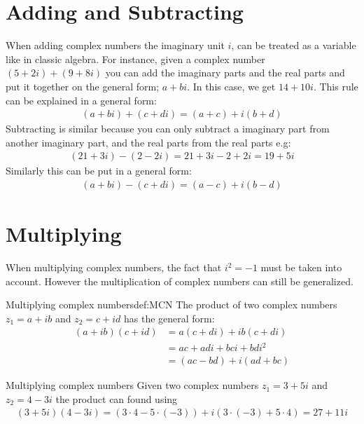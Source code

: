 \section{Adding and Subtracting}
When adding complex numbers the imaginary unit $i$, can be treated as a variable like in classic algebra. For instance, given a complex number $(5+2i)+(9+8i)$ you can add the imaginary parts and the real parts and put it together on the general form; $a+bi$. In this case, we get $14+10i$. This rule can be explained in a general form: 
\begin{align*}
(a + bi) + (c + di) = (a + c) + i(b + d)
\end{align*}
Subtracting is similar because you can only subtract a imaginary part from another imaginary part, and the real parts from the real parts e.g:
\begin{align*}
(21 + 3i) - (2 - 2i) = 21 + 3i - 2 + 2i = 19 + 5i
\end{align*}
Similarly this can be put in a general form:
\begin{align*}
(a + bi) - (c + di) = (a - c) + i(b - d)
\end{align*}

\section{Multiplying}
When multiplying complex numbers, the fact that $i^2 =-1$ must be taken into account. However the multiplication of complex numbers can still be generalized. 
\begin{definition}{Multiplying complex numbers}{def:MCN}
The product of two complex numbers $z_1=a+ib$ and $z_2=c+id$ has the general form:
\begin{align*}
(a+ib)(c+id)&=a(c+di)+ib(c+di)
\\
&=ac+adi+bci+bdi^2
\\
&=(ac-bd)+i(ad+bc)
\end{align*}
\end{definition}
\begin{example}{Multiplying complex numbers}{}
Given two complex numbers $z_1=3+5i$ and $z_2=4-3i$ the product can found using 
\begin{align*}
(3+5i)(4-3i) = (3\cdot4-5\cdot(-3))+i(3\cdot(-3)+5\cdot4)=27+11i
\end{align*}
\end{example}


